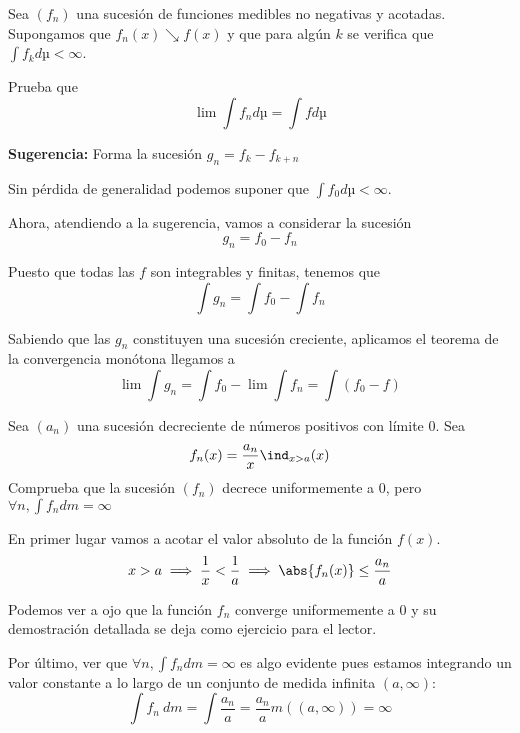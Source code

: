 \begin{problem}[9]

Sea $(f_n)$ una sucesión de funciones medibles no negativas y acotadas. Supongamos que $f_n(x) \searrow f(x)$ y que para algún $k$ se verifica que $\int f_k dµ < \infty$.

Prueba que
\[\lim \int f_n dµ = \int f dµ\]

\textbf{Sugerencia:} Forma la sucesión $g_n = f_k -f_{k+n}$

\solution

Sin pérdida de generalidad podemos suponer que $\int f_0 dµ < \infty$.

Ahora, atendiendo a la sugerencia, vamos a considerar la sucesión
\[g_n = f_0 - f_n\]

Puesto que todas las $f$ son integrables y finitas, tenemos que
\[\int g_n = \int f_0 - \int f_n\]

Sabiendo que las $g_n$ constituyen una sucesión creciente, aplicamos el teorema de la convergencia monótona llegamos a
\[\lim \int g_n = \int f_0 - \lim \int f_n = \int (f_0-f)\]
\end{problem}

\begin{problem}[10]
Sea $(a_n)$ una sucesión decreciente de números positivos con límite 0. Sea
\[f_n(x) = \frac{a_n}{x} \ind_{x > a}(x)\]
Comprueba que la sucesión $(f_n)$ decrece uniformemente a 0, pero $\forall n, \int f_n dm = \infty$

\solution

En primer lugar vamos a acotar el valor absoluto de la función $f(x)$.
\[x>a \implies \frac{1}{x} < \frac{1}{a} \implies \abs{f_n(x)} \leq \frac{a_n}{a}\]

Podemos ver a ojo que la función $f_n$ converge uniformemente a 0 y su demostración detallada se deja como ejercicio para el lector.

Por último, ver que $\forall n, \int f_n dm = \infty$ es algo evidente pues estamos integrando un valor constante a lo largo de un conjunto de medida infinita $(a, \infty)$:
\[\int f_n \ dm = \int \frac{a_n}{a} = \frac{a_n}{a} m((a, \infty)) = \infty\]

\end{problem}

